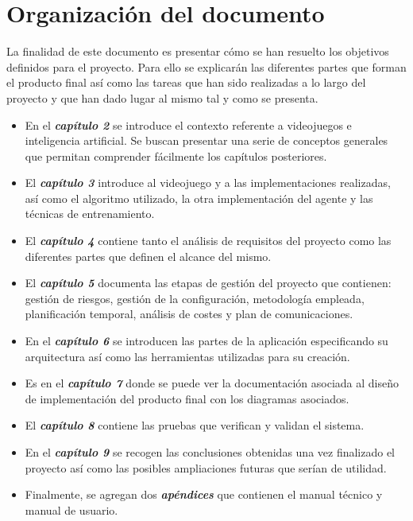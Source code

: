 \section{Organización del documento}

La finalidad de este documento es presentar cómo se han resuelto los objetivos definidos para el proyecto. Para ello se explicarán las diferentes partes que forman el producto final así como las tareas que han sido realizadas a lo largo del proyecto y que han dado lugar al mismo tal y como se presenta.

\begin{itemize}
	\item En el \textbf{\textit{capítulo 2}} se introduce el contexto referente a videojuegos e inteligencia artificial. Se buscan presentar una serie de conceptos generales que permitan comprender fácilmente los capítulos posteriores.
	\item El \textbf{\textit{capítulo 3}} introduce al videojuego y a las implementaciones realizadas, así como el algoritmo utilizado, la otra implementación del agente y las técnicas de entrenamiento.
	\item El \textbf{\textit{capítulo 4}} contiene tanto el análisis de requisitos del proyecto como las diferentes partes que definen el alcance del mismo.
	\item El \textbf{\textit{capítulo 5}} documenta las etapas de gestión del proyecto que contienen: gestión de riesgos, gestión de la configuración, metodología empleada, planificación temporal, análisis de costes y plan de comunicaciones.
	\item En el \textbf{\textit{capítulo 6}} se introducen las partes de la aplicación especificando su arquitectura así como las herramientas utilizadas para su creación.
	\item Es en el \textbf{\textit{capítulo 7}} donde se puede ver la documentación asociada al diseño de implementación del producto final con los diagramas asociados.
	\item El \textbf{\textit{capítulo 8}} contiene las pruebas que verifican y validan el sistema.
	\item En el \textbf{\textit{capítulo 9}} se recogen las conclusiones obtenidas una vez finalizado el proyecto así como las posibles ampliaciones futuras que serían de utilidad.
	\item Finalmente, se agregan dos \textbf{\textit{apéndices}} que contienen el manual técnico y manual de usuario.
\end{itemize}



